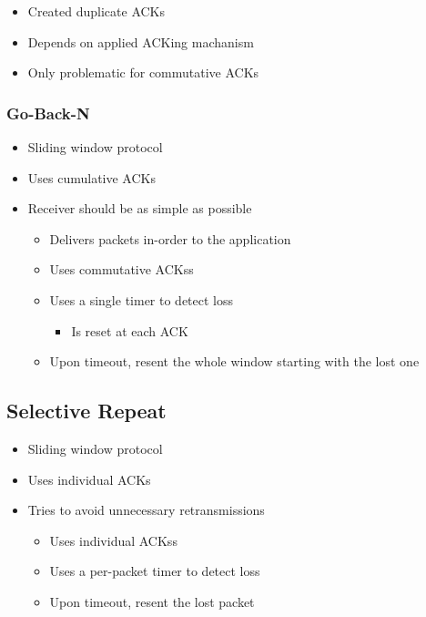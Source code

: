 \begin{itemize}
\begin{itemize}
\begin{itemize}
                    \item Created duplicate ACKs
                    \item Depends on applied ACKing machanism
                    \item Only problematic for commutative ACKs
                \end{itemize}
        \end{itemize}
\end{itemize}

\subsubsection{Go-Back-N}
\begin{itemize}
    \item Sliding window protocol
    \item Uses cumulative ACKs
    \item Receiver should be as simple as possible
        \begin{itemize}
            \item Delivers packets in-order to the application
            \item Uses commutative ACKss
        \end{itemize}
        \begin{itemize}
            \item Uses a single timer to detect loss
                \begin{itemize}
                    \item Is reset at each ACK
                \end{itemize}
            \item Upon timeout, resent the whole window starting with the lost one
        \end{itemize}
\end{itemize}

\subsection{Selective Repeat}
\begin{itemize}
\item Sliding window protocol
\item Uses individual ACKs
\item Tries to avoid unnecessary retransmissions
        \begin{itemize}
            \item Uses individual ACKss
        \end{itemize}
        \begin{itemize}
            \item Uses a per-packet timer to detect loss
            \item Upon timeout, resent the lost packet
        \end{itemize}
\end{itemize}


